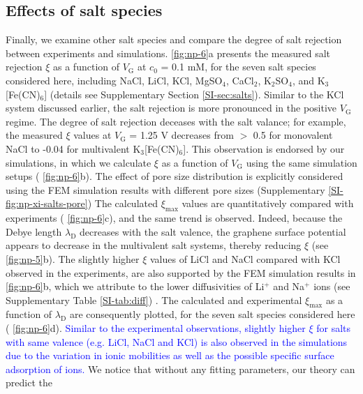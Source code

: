 \subsection{Effects of salt species}
\label{sec:salts}

Finally, we examine other salt species and compare the degree of salt
rejection between experiments and simulations.  \autoref{fig:np-6}a
presents the measured salt rejection $\xi$ as a function of
$V_{\mathrm{G}}$ at $c_{0}$ = 0.1 mM, for the seven salt species
considered here, including NaCl, LiCl, KCl, MgSO$_{4}$, CaCl$_{2}$,
K$_{2}$SO$_{4}$, and K$_{3}$[Fe(CN)$_{6}$] (details see Supplementary
Section \autoref{SI-sec:salts}). Similar to the KCl system discussed
earlier, the salt rejection is more pronounced in the positive
$V_{\mathrm{G}}$ regime.
%
The degree of salt rejection deceases with the salt valance; for
example, the measured $\xi$ values at $V_{\mathrm{G}}$ = 1.25 V
decreases from $>$ 0.5 for monovalent NaCl to -0.04 for multivalent
K$_{3}$[Fe(CN)$_{6}$]. This observation is endorsed by our
simulations, in which we calculate $\xi$ as a function of
$V_{\mathrm{G}}$ using the same simulation setups (
\autoref{fig:np-6}b).  { The effect of pore size distribution is explicitly
  considered using the FEM simulation results with different pore
  sizes (Supplementary  \autoref{SI-fig:np-xi-salts-pore})} The
calculated $\xi_{\mathrm{max}}$ values are quantitatively compared
with experiments ( \autoref{fig:np-6}c), and the same trend is
observed. Indeed, because the Debye length $\lambda_{\mathrm{D}}$
decreases with the salt valence, the graphene surface potential
appears to decrease in the multivalent salt systems, thereby reducing
$\xi$ (see  \autoref{fig:np-5}b).  { The slightly higher $\xi$ values
  of LiCl and NaCl compared with KCl observed in the experiments, are
  also supported by the FEM simulation results in  \autoref{fig:np-6}b,
  which we attribute to the lower diffusivities of Li$^{+}$ and
  Na$^{+}$ ions (see Supplementary Table \autoref{SI-tab:diff}) }.  The
calculated and experimental $\xi_{\mathrm{max}}$ as a function of
$\lambda_{\mathrm{D}}$ are consequently plotted, for the seven salt
species considered here ( \autoref{fig:np-6}d).  \textcolor{blue}{
  Similar to the experimental observations, slightly higher $\xi$ for
  salts with same valence (e.g. LiCl, NaCl and KCl) is also observed
  in the simulations due to the variation in ionic mobilities as well
  as the possible specific surface adsorption of ions.} We notice that
without any fitting parameters, our theory can predict the
